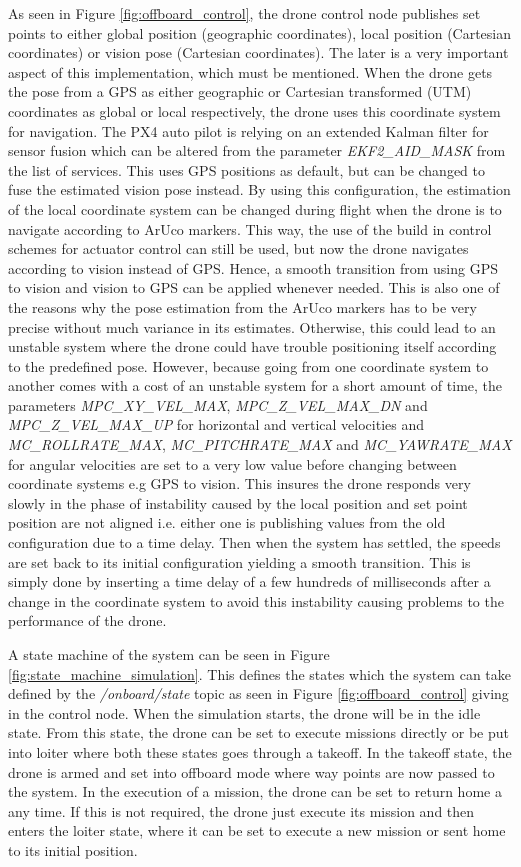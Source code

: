 \documentclass[../Head/report.tex]{subfiles}
\begin{document}
As seen in Figure \ref{fig:offboard_control}, the drone control node publishes set points to either global position (geographic coordinates), local position (Cartesian coordinates) or vision pose (Cartesian coordinates). The later is a very important aspect of this implementation, which must be mentioned. When the drone gets the pose from a GPS as either   geographic or Cartesian transformed (UTM) coordinates as global or local respectively, the drone uses this coordinate system for navigation. The PX4 auto pilot is relying on an extended Kalman filter for sensor fusion which can be altered from the parameter \textit{EKF2\_AID\_MASK} from the list of services. This uses GPS positions as default, but can be changed to fuse the estimated vision pose instead. By using this configuration, the estimation of the local coordinate system can be changed during flight when the drone is to navigate according to ArUco markers. This way, the use of the build in control schemes for actuator control can still be used, but now the drone navigates according to vision instead of GPS. Hence, a smooth transition from using GPS to vision and vision to GPS can be applied whenever needed. This is also one of the reasons why the pose estimation from the ArUco markers has to be very precise without much variance in its estimates. Otherwise, this could lead to an unstable system where the drone could have trouble positioning itself according to the predefined pose. However, because going from one coordinate system to another comes with a cost of an unstable system for a short amount of time, the parameters \textit{MPC\_XY\_VEL\_MAX}, \textit{MPC\_Z\_VEL\_MAX\_DN} and  \textit{MPC\_Z\_VEL\_MAX\_UP} for horizontal and vertical velocities  and \textit{MC\_ROLLRATE\_MAX}, \textit{MC\_PITCHRATE\_MAX} and \textit{MC\_YAWRATE\_MAX} for angular velocities are set to a very low value before changing between coordinate systems e.g GPS to vision. This insures the drone responds very slowly in the phase of instability caused by the local position and set point position are not aligned i.e. either one is publishing values from the old configuration due to a time delay. Then when the system has settled, the speeds are set back to its initial configuration yielding a smooth transition. This is simply done by inserting a time delay of a few hundreds of milliseconds after a change in the coordinate system to avoid this instability causing problems to the performance of the drone. 

A state machine of the system can be seen in Figure \ref{fig:state_machine_simulation}. This defines the states which the system can take defined by the \textit{/onboard/state} topic as seen in Figure \ref{fig:offboard_control} giving in the control node. When the simulation starts, the drone will be in the idle state. From this state, the drone can be set to execute missions directly or be put into loiter where both these states goes through a takeoff. In the takeoff state, the drone is armed and set into offboard mode where way points are now passed to the system. In the execution of a mission, the drone can be set to return home a any time. If this is not required, the drone just execute its mission and then enters the loiter state, where it can be set to execute a new mission or sent home to its initial position.  
\end{document}
